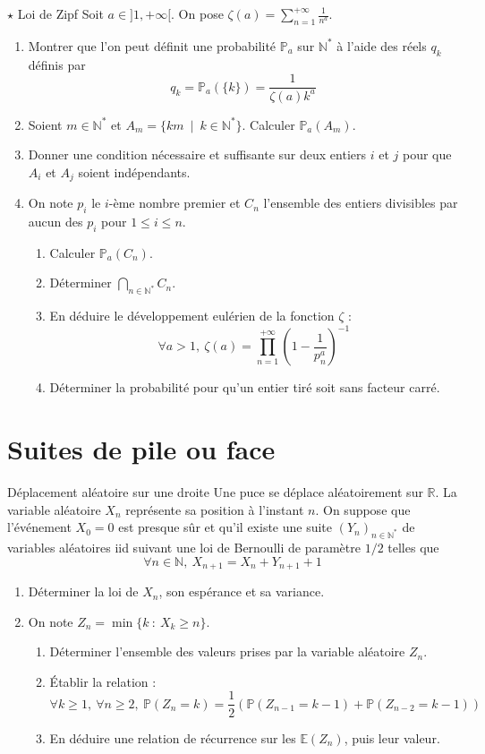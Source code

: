 \documentclass[french,a4paper]{article}
\renewcommand{\P}{\mathbb{P}}
\newcommand{\N}{\mathbb{N}}
\newcommand{\R}{\mathbb{R}}
\newcommand{\st}{^*}
\newcommand{\inv}{^{-1}}
\newcommand{\E}{\mathbb{E}}
\theoremstyle{plain}
\theoremstyle{definition}
\theoremstyle{remark}
\begin{document}
\begin{ex}[Châteaux]{$\star$ Loi de Zipf}
	Soit $a\in]1,+\infty[$. On pose $\zeta(a)=\displaystyle\sum_{n=1}^{+\infty}\frac{1}{n^a}$.
	\begin{enumerate}
		\item Montrer que l'on peut définit une probabilité $\P_a$ sur $\N\st$ à l'aide des réels $q_k$ définis par $$q_k=\P_a(\{k\})=\frac{1}{\zeta(a)k^a}$$
		\item Soient $m\in\N\st$ et $A_m=\{km\ \mid \ k\in\N\st\}$. Calculer $\P_a(A_m)$.
		\item Donner une condition nécessaire et suffisante sur deux entiers $i$ et $j$ pour que $A_i$ et $A_j$ soient indépendants.
		\item On note $p_i$ le $i$-ème nombre premier et $C_n$ l'ensemble des entiers divisibles par aucun des $p_i$ pour $1\leqslant i\leqslant n$.
		\begin{enumerate}[label=\alph*.]
			\item Calculer $\P_a(C_n)$.
			\item Déterminer $\displaystyle\bigcap_{n\in\N\st}C_n$.
			\item En déduire le développement eulérien de la fonction $\zeta$ : $$\forall a>1,\ \zeta(a)=\prod_{n=1}^{+\infty}\left(1-\frac{1}{p_n^a}\right)\inv$$
			\item Déterminer la probabilité pour qu'un entier tiré soit sans facteur carré.
		\end{enumerate}
	\end{enumerate}
\end{ex}

\section{Suites de pile ou face}

\begin{ex}[Moulin.37]{Déplacement aléatoire sur une droite}
	Une puce se déplace aléatoirement sur $\R$. La variable aléatoire $X_n$ représente sa position à l'instant $n$. On suppose que l'événement $X_0=0$ est presque sûr et qu'il existe une suite $(Y_n)_{n\in\N\st}$ de variables aléatoires iid suivant une loi de Bernoulli de paramètre $1/2$ telles que $$\forall n\in\N,\ X_{n+1}=X_n+Y_{n+1}+1$$
	\begin{enumerate}
		\item Déterminer la loi de $X_n$, son espérance et sa variance.
		\item On note $Z_n=\min\{k\ :\ X_k\geqslant n\}$.
		\begin{enumerate}[label=\alph*.]
			\item Déterminer l'ensemble des valeurs prises par la variable aléatoire $Z_n$.
			\item Établir la relation : $$\forall k\geqslant 1,\ \forall n\geqslant 2,\ \P(Z_n=k)=\frac12\left(\P(Z_{n-1}=k-1)+\P(Z_{n-2}=k-1)\right)$$
			\item En déduire une relation de récurrence sur les $\E(Z_n)$, puis leur valeur.
		\end{enumerate}
	\end{enumerate}
\end{ex}
\end{document}
